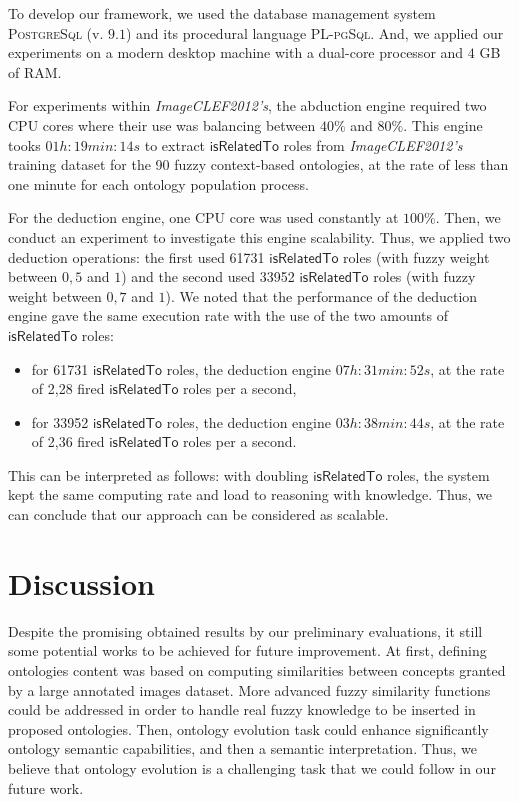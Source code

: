 		To develop our framework, we used the database management system
		\textsc{PostgreSql} (v. $9.1$) and its procedural language
 		\textsc{PL-pgSql}.
		And, we applied our experiments on a modern desktop machine with a dual-core
 		processor and $4$ GB of RAM. 

		For experiments within \emph{ImageCLEF2012's}, the abduction engine required
		two CPU cores where their use was balancing between $40\%{}$ and $80\%{}$. 
		This engine tooks $01h:19min:14s$ to extract $\mathsf{isRelatedTo}$ roles from 
		\emph{ImageCLEF2012's} training dataset for the 90 fuzzy context-based ontologies,
		at the rate of less than one minute for each ontology population process.

		For the deduction engine, one CPU core was used constantly at $100\%{}$. Then, 
		we conduct an experiment to investigate this engine scalability. Thus, we applied 
		two deduction operations: the first used  61731 $\mathsf{isRelatedTo}$ roles 
		(with fuzzy weight between $0,5$ and $1$) and the second used 33952 $\mathsf{isRelatedTo}$ 
		roles (with fuzzy weight between $0,7$ and $1$). We noted that the performance of the deduction engine gave 
		the same execution rate with the use of the two amounts of $\mathsf{isRelatedTo}$ roles: 
		\begin{itemize}
			\item for 61731 $\mathsf{isRelatedTo}$ roles, the deduction engine 
			$07h:31min:52s$, at the rate of 2,28 fired $\mathsf{isRelatedTo}$ roles per a second,
			\item for 33952 $\mathsf{isRelatedTo}$ roles, the deduction engine  $03h:38min:44s$, 
			at the rate of 2,36 fired $\mathsf{isRelatedTo}$ roles per a second.
		\end{itemize} 
		This can be interpreted as follows: with doubling $\mathsf{isRelatedTo}$ roles, the system 
		kept the same computing rate and load to reasoning with knowledge. Thus, we can conclude that our approach
		can be considered as scalable.

	\section{Discussion}

		Despite the promising obtained results by our preliminary evaluations, it still 
		some potential works to be achieved for future improvement. At first, defining 
		ontologies content was based on computing similarities between concepts granted by a large
		annotated images dataset. More advanced fuzzy similarity functions could be addressed
		in order to handle real fuzzy knowledge to be inserted in proposed ontologies. 
		Then, ontology evolution task could enhance significantly ontology semantic capabilities, 
		and then a semantic interpretation. Thus, we believe that ontology evolution is a 
		challenging task that we could follow in our future work.


